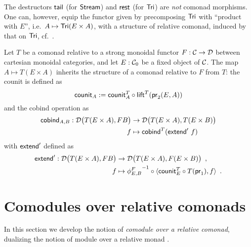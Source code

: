 \documentclass[envcountsame]{llncs}
\begin{document}
\begin{Long}

\begin{remark}
 The destructors $\stail$ (for $\stream$) and $\tail$ (for $\Tri$) are \emph{not} comonad morphisms.
 One can, however, equip the functor given by precomposing $\Tri$ with \enquote{product with $E$}, i.e.\
 $A \mapsto \Tri (E\times A)$, with a structure of relative comonad, induced by that
 on $\Tri$, cf.\ \Cref{product_comonad}.
\end{remark}


\begin{definition}\label{product_comonad}
  Let $T$ be a comonad relative to a strong monoidal functor $F:\C\to\D$ between cartesian monoidal categories,
  and let $E:\C_0$ be a fixed object of $\C$.
 The map $A\mapsto T(E\times A)$ inherits the structure of a comonad relative to $F$ from $T$: the 
 counit is defined as
   \[ \counit_A := \comp{\lift^T(\pr_2(E,A))}{\counit^T_{A}} \]
  and the cobind operation as
   \begin{align*} 
            \cobind_{A,B} : \D\bigl(T(E\times A),FB\bigr) &\to \D\bigl(T(E\times A),T(E\times B)\bigr) \\
              f &\mapsto  \cobind^T(\extend'~f)
   \end{align*}
  with $\extend'$ defined as 
  \begin{align*} \extend' : \D\bigl(T(E\times A),FB\bigr) &\to \D\bigl(T(E\times A), F(E\times B)\bigr) \enspace , \\ 
                                            f & \mapsto \comp{\langle \comp{T(\pr_1)}{\counit^T_E}, f \rangle}{{\phi^{F}_{E,B}}^{-1}} \enspace .
  \end{align*}
\end{definition}

\end{Long}




\section{Comodules over relative comonads}\label{sec:comodules}

In this section we develop the notion of \emph{comodule over a relative comonad}, dualizing the notion of module over a relative monad \parencite{ahrens_relmonads}.
\end{document}
